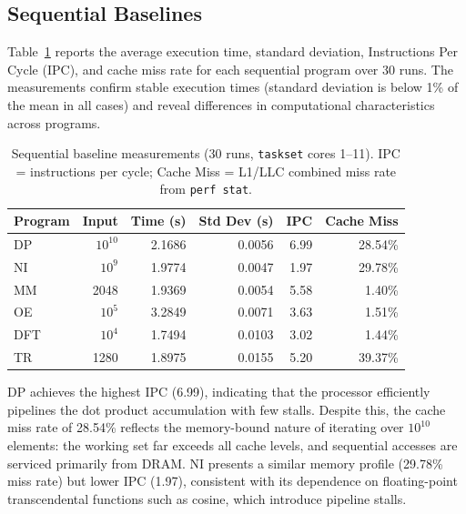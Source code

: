 \documentclass[conference]{IEEEtran}
\begin{document}
\subsection{Sequential Baselines} \label{sec:res_baseline}

Table~\ref{tab:baseline} reports the average execution time, standard deviation, Instructions Per Cycle (IPC), and cache miss rate for each sequential program over 30 runs. 
The measurements confirm stable execution times (standard deviation is below 1\% of the mean in all cases) and reveal differences in computational characteristics across programs.

\begin{table}[tbp]
\centering
\caption{Sequential baseline measurements (30 runs, \texttt{taskset} cores 1--11). IPC = instructions per cycle; Cache Miss = L1/LLC combined miss rate from \texttt{perf stat}.}
\label{tab:baseline}
\begin{tabular}{lrrrrr}
\toprule
\textbf{Program} & \textbf{Input} & \textbf{Time (s)} & \textbf{Std Dev (s)} & \textbf{IPC} & \textbf{Cache Miss} \\
\midrule
DP  & $10^{10}$ & 2.1686 & 0.0056 & 6.99 & 28.54\% \\
NI  & $10^{9}$  & 1.9774 & 0.0047 & 1.97 & 29.78\% \\
MM  & 2048      & 1.9369 & 0.0054 & 5.58 &  1.40\% \\
OE  & $10^{5}$  & 3.2849 & 0.0071 & 3.63 &  1.51\% \\
DFT & $10^{4}$  & 1.7494 & 0.0103 & 3.02 &  1.44\% \\
TR  & 1280      & 1.8975 & 0.0155 & 5.20 & 39.37\% \\
\bottomrule
\end{tabular}
\end{table}

DP achieves the highest IPC (6.99), indicating that the processor efficiently pipelines the dot product accumulation with few stalls. Despite this, the cache miss rate of 28.54\% reflects the memory-bound nature of iterating over $10^{10}$ elements: the working set far exceeds all cache levels, and sequential accesses are serviced primarily from DRAM. NI presents a similar memory profile (29.78\% miss rate) but lower IPC (1.97), consistent with its dependence on floating-point transcendental functions such as cosine, which introduce pipeline stalls.
\end{document}
